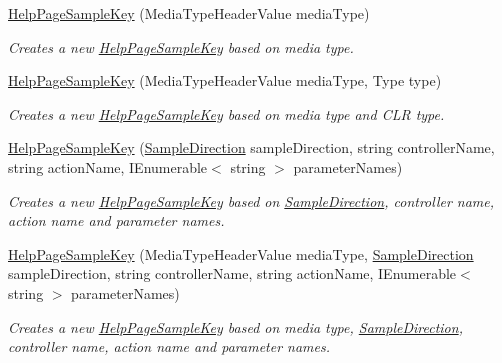 \begin{DoxyCompactItemize}
\item 
\hyperlink{class_w_s1aarsproeve_1_1_areas_1_1_help_page_1_1_help_page_sample_key_ab9bf1ca3723aca11ab9a912101238018}{Help\+Page\+Sample\+Key} (Media\+Type\+Header\+Value media\+Type)
\begin{DoxyCompactList}\small\item\em Creates a new \hyperlink{class_w_s1aarsproeve_1_1_areas_1_1_help_page_1_1_help_page_sample_key}{Help\+Page\+Sample\+Key} based on media type. \end{DoxyCompactList}\item 
\hyperlink{class_w_s1aarsproeve_1_1_areas_1_1_help_page_1_1_help_page_sample_key_a40981c473e9ae2211e0e7bcfaceda021}{Help\+Page\+Sample\+Key} (Media\+Type\+Header\+Value media\+Type, Type type)
\begin{DoxyCompactList}\small\item\em Creates a new \hyperlink{class_w_s1aarsproeve_1_1_areas_1_1_help_page_1_1_help_page_sample_key}{Help\+Page\+Sample\+Key} based on media type and C\+L\+R type. \end{DoxyCompactList}\item 
\hyperlink{class_w_s1aarsproeve_1_1_areas_1_1_help_page_1_1_help_page_sample_key_a71025181698b607423d176758aacfe98}{Help\+Page\+Sample\+Key} (\hyperlink{namespace_w_s1aarsproeve_1_1_areas_1_1_help_page_a68a9a343f44949e9781196ca9699289c}{Sample\+Direction} sample\+Direction, string controller\+Name, string action\+Name, I\+Enumerable$<$ string $>$ parameter\+Names)
\begin{DoxyCompactList}\small\item\em Creates a new \hyperlink{class_w_s1aarsproeve_1_1_areas_1_1_help_page_1_1_help_page_sample_key}{Help\+Page\+Sample\+Key} based on \hyperlink{class_w_s1aarsproeve_1_1_areas_1_1_help_page_1_1_help_page_sample_key_a4d02725ac4f265d06bfb42d669de3edc}{Sample\+Direction}, controller name, action name and parameter names. \end{DoxyCompactList}\item 
\hyperlink{class_w_s1aarsproeve_1_1_areas_1_1_help_page_1_1_help_page_sample_key_a67b5bb876d265c39a0fb58529fbe28c5}{Help\+Page\+Sample\+Key} (Media\+Type\+Header\+Value media\+Type, \hyperlink{namespace_w_s1aarsproeve_1_1_areas_1_1_help_page_a68a9a343f44949e9781196ca9699289c}{Sample\+Direction} sample\+Direction, string controller\+Name, string action\+Name, I\+Enumerable$<$ string $>$ parameter\+Names)
\begin{DoxyCompactList}\small\item\em Creates a new \hyperlink{class_w_s1aarsproeve_1_1_areas_1_1_help_page_1_1_help_page_sample_key}{Help\+Page\+Sample\+Key} based on media type, \hyperlink{class_w_s1aarsproeve_1_1_areas_1_1_help_page_1_1_help_page_sample_key_a4d02725ac4f265d06bfb42d669de3edc}{Sample\+Direction}, controller name, action name and parameter names. \end{DoxyCompactList}\item 

\end{DoxyCompactItemize}
